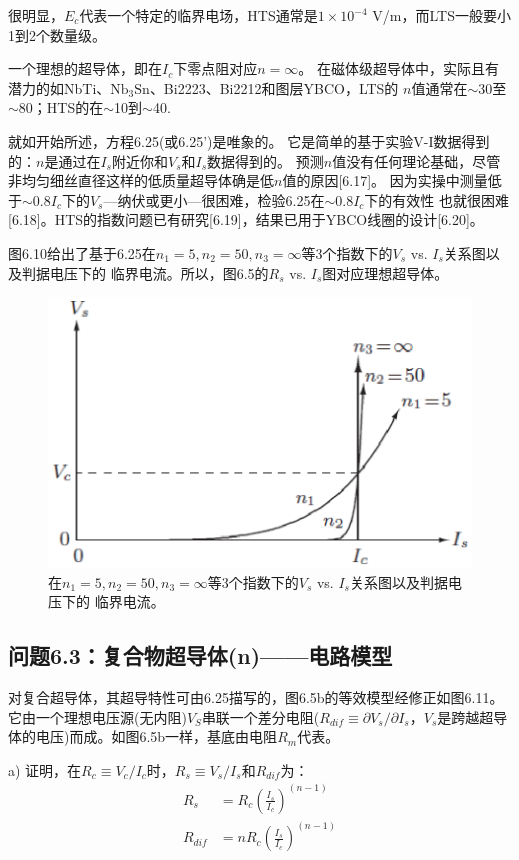 很明显，$E_c$代表一个特定的临界电场，HTS通常是$1\times 10^{-4}$ V/m，而LTS一般要小1到2个数量级。

一个理想的超导体，即在$I_c$下零点阻对应$n=\infty$。
在磁体级超导体中，实际且有潜力的如NbTi、$\mathrm{Nb_3 Sn}$、Bi2223、Bi2212和图层YBCO，LTS的
$n$值通常在$\sim$30至$\sim$80；HTS的在$\sim$10到$\sim$40.

就如开始所述，方程6.25(或6.25')是唯象的。
它是简单的基于实验V-I数据得到的：$n$是通过在$I_s$附近你和$V_s$和$I_s$数据得到的。
预测$n$值没有任何理论基础，尽管非均匀细丝直径这样的低质量超导体确是低$n$值的原因[6.17]。
因为实操中测量低于$\sim 0.8 I_c$下的$V_s$---纳伏或更小---很困难，检验6.25在$\sim 0.8 I_c$下的有效性
也就很困难[6.18]。HTS的指数问题已有研究[6.19]，结果已用于YBCO线圈的设计[6.20]。

图6.10给出了基于6.25在$n_1=5,n_2=50,n_3=\infty$等3个指数下的$V_s$ vs. $I_s$关系图以及判据电压下的
临界电流。所以，图6.5的$R_s$ vs. $I_s$图对应理想超导体。
\begin{figure}[htbp]
	\centering
	\includegraphics[scale=0.7]{chpt6/figs/fig6.10.eps}
	\caption{在$n_1=5,n_2=50,n_3=\infty$等3个指数下的$V_s$ vs. $I_s$关系图以及判据电压下的
		临界电流。}
\end{figure}

\subsection{问题6.3：复合物超导体(n)——电路模型}
对复合超导体，其超导特性可由6.25描写的，图6.5b的等效模型经修正如图6.11。
它由一个理想电压源(无内阻)$V_S$串联一个差分电阻($R_{dif}\equiv \partial V_s/\partial I_s$，$V_s$是跨越超导体的电压)而成。如图6.5b一样，基底由电阻$R_m$代表。

a) 证明，在$R_c\equiv V_c/I_c$时，$R_s\equiv V_s/I_s$和$R_{dif}$为：
\begin{subequations}
	\begin{align}
	R_s&=R_c(\frac{I_s}{I_c})^{(n-1)}\\
	R_{dif}&=nR_c(\frac{I_s}{I_c})^{(n-1)}
	\end{align}
\end{subequations}

